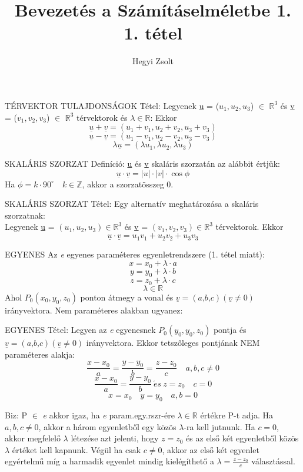 \documentclass[]{article}
\title{Bevezetés a Számításelméletbe 1.\\{\large 1. tétel}}
\author{Hegyi Zsolt}
\newcommand{\R}{\mathbb{R}}
\newcommand{\Rn}[1]{$\mathbb{R}^{#1}$}
\begin{document}
\maketitle{}
\begin{framed}
TÉRVEKTOR TULAJDONSÁGOK Tétel: Legyenek \underline{u} = ($u_1, u_2, u_3$) $\in$ \Rn{3} és \underline{v} = ($v_1, v_2, v_3$) $\in$ \Rn{3} térvektorok és $\lambda \in \R$: Ekkor\\
$$\underline{u} + \underline{v} = (u_1 + v_1, u_2 + v_2, u_3 + v_3)$$
$$\underline{u} - \underline{v} = (u_1 - v_1, u_2 - v_2, u_3 - v_3)$$
$$\lambda \underline{u} = (\lambda u_1,\lambda u_2, \lambda u_3)$$
\end{framed}
\begin{shaded}
SKALÁRIS SZORZAT Definíció: \underline{u} és \underline{v} skaláris szorzatán az alábbit értjük: 
$$\underline{u}\cdot\underline{v} = |u|\cdot|v|\cdot\cos\phi$$
Ha $\phi = k\cdot90^{\circ}\quad k\in\mathbb{Z}$, akkor a szorzatösszeg 0.
\end{shaded}
\begin{framed}
SKALÁRIS SZORZAT Tétel: Egy alternatív meghatározása a skaláris szorzatnak: \\Legyenek \underline{u} = $(u_1, u_2, u_3)\in$\Rn{3} és \underline{v} = $(v_1, v_2, v_3)\in$\Rn{3} térvektorok. Ekkor $$\underline{u}\cdot\underline{v} = u_1 v_1 + u_2 v_2 + u_3 v_3$$
\end{framed}
EGYENES Az \textit{e} egyenes paraméteres egyenletrendszere (1. tétel miatt):
$$x = x_0 + \lambda \cdot a$$
$$y = y_0 + \lambda \cdot b$$
$$z = z_0 + \lambda \cdot c$$
$$\lambda \in \R$$
Ahol $P_0 (x_0,y_0,z_0)$ ponton átmegy a vonal és $\underline{v} = (\textit{a,b,c})  (\underline{v} \neq 0)$ irányvektora.
Nem paraméteres alakban ugyanez:
\begin{framed}
EGYENES Tétel: Legyen az \textit{e} egyenesnek $P_0 (y_0,y_0,z_0)$ pontja és $\underline{v} = (\textit{a,b,c})  (\underline{v} \neq 0)$ irányvektora. Ekkor tetszőleges pontjának NEM paraméteres alakja:
$$\frac{x-x_0}{a} = \frac{y-y_0}{b} = \frac{z-z_0}{c}\quad a, b, c \neq 0$$
$$\frac{x-x_0}{a} = \frac{y-y_0}{b} \:\acute{e}s\: z = z_0 \quad c = 0$$
$$x = x_0\quad y = y_0\quad a,b = 0$$
\end{framed}
\begin{leftbar}
Biz: P $\in$ \textit{e} akkor igaz, ha \textit{e} param.egy.rszr-ére $\lambda \in \R$ értékre P-t adja. Ha $a,b,c \neq 0$, akkor a három egyenletből egy közös $\lambda$-ra kell jutnunk. Ha $c=0$, akkor megfelelő $\lambda$ létezése azt jelenti, hogy $z=z_0$ és az első két egyenletből közös $\lambda$ értéket kell kapnunk. Végül ha csak $c\neq0$, akkor az első két egyenlet egyértelmű míg a harmadik egyenlet mindig kielégíthető a $\lambda = \frac{z-z_0}{c}$ választással.
\end{leftbar}
\end{document}
